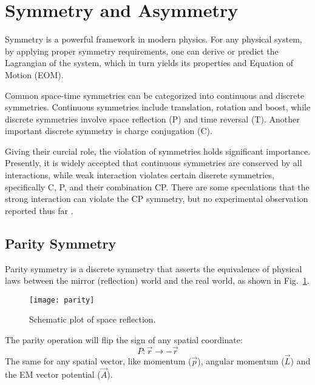 \section{Symmetry and Asymmetry}
Symmetry is a powerful framework in modern physics. For any physical system, 
by applying proper symmetry requirements, one can derive or predict
the Lagrangian of the system, which in turn yields its properties and Equation of Motion (EOM).

Common space-time symmetries can be categorized into continuous and discrete symmetries. 
Continuous symmetries include translation, rotation and boost, 
while discrete symmetries involve space reflection (P) and time reversal (T).
Another important discrete symmetry is charge conjugation (C).

Giving their curcial role, the violation of symmetries holds significant importance.
Presently, it is widely accepted that continuous symmetries are conserved 
by all interactions, while weak interaction violates certain discrete symmetries, 
specifically C, P, and their combination CP. There are some speculations that 
the strong interaction can violate the CP symmetry, but no
experimental observation reported thus far \cite{MANNEL2007170}.

\subsection{Parity Symmetry}
Parity symmetry is a discrete symmetry that asserts the equivalence of physical 
laws between the mirror (reflection) world and the real world, as shown in 
Fig.~\ref{fig:space_reflection}. 
\begin{figure}[!h]
    \centering
    \texttt{[image: parity]}
    \label{fig:space_reflection}
    \caption{Schematic plot of space reflection.}
\end{figure}

The parity operation will flip the sign of any spatial coordinate:
\begin{equation}
    P: \vec{r} \rightarrow -\vec{r}
\end{equation}
The same for any spatial vector, like momentum ($\vec{p}$), angular momentum ($\vec{L}$)
and the EM vector potential ($\vec{A}$).

